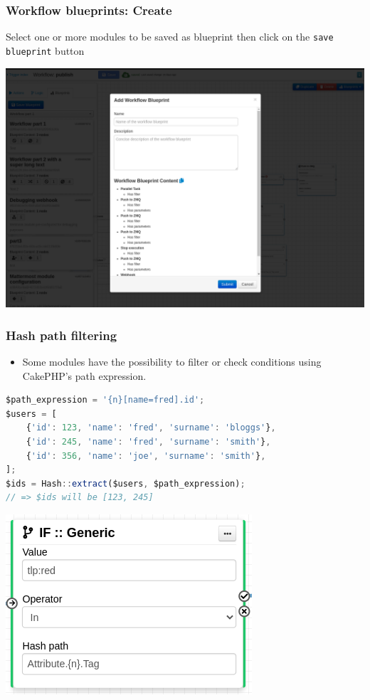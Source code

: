 \begin{frame}
    \frametitle{Workflow blueprints: Create}
    Select one or more modules to be saved as blueprint then click on the \texttt{save blueprint} button
    \begin{center}
        \includegraphics[width=0.85\linewidth]{pictures/blueprint-1.png}
    \end{center}
\end{frame}

\begin{frame}[fragile]
    \frametitle{Hash path filtering}
    \begin{itemize}
        \item Some modules have the possibility to filter or check conditions using CakePHP's path expression.
    \end{itemize}
\begin{lstlisting}[language=javascript,firstnumber=1]
$path_expression = '{n}[name=fred].id';
$users = [
    {'id': 123, 'name': 'fred', 'surname': 'bloggs'},
    {'id': 245, 'name': 'fred', 'surname': 'smith'},
    {'id': 356, 'name': 'joe', 'surname': 'smith'},
];
$ids = Hash::extract($users, $path_expression);
// => $ids will be [123, 245]
\end{lstlisting}
\begin{center}
    \includegraphics[width=0.4\linewidth]{pictures/module-if-generic.png}
\end{center}
\end{frame}


